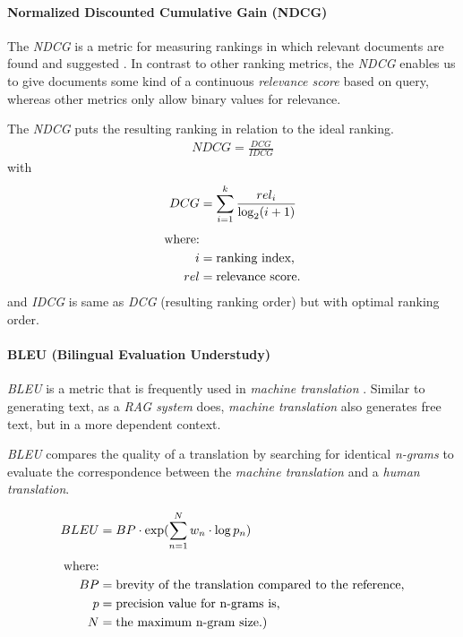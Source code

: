 \documentclass{article}
\begin{document}
\paragraph{Normalized Discounted Cumulative Gain (NDCG)}
The \textit{NDCG} is a metric for measuring rankings in which relevant documents are found and suggested \cite{NDCG}. In contrast to other ranking metrics, the \textit{NDCG} enables us to give documents some kind of a continuous \textit{relevance score} based on query, whereas other metrics only allow binary values for relevance.

The \textit{NDCG} puts the resulting ranking in relation to the ideal ranking.
\begin{align}
	 NDCG=\frac{DCG}{IDCG}
\end{align}
with
\begin{align*}
\begin{split}
	DCG&=\sum_{i=1}^{k}\frac{rel_{i}}{\log_{2}(i+1)}\\[0.25\baselineskip]
	\text{where:}\\
	i &= \text{ranking index,}\\ 
	rel &= \text{relevance score.}
\end{split}
\end{align*}
and \textit{IDCG} is same as \textit{DCG} (resulting ranking order) but with optimal ranking order.

\paragraph{BLEU (Bilingual Evaluation Understudy)} \textit{BLEU} is a metric that is frequently used in \textit{machine translation} \cite{BLEU}. Similar to generating text, as a \textit{RAG system} does, \textit{machine translation} also generates free text, but in a more dependent context.

\textit{BLEU} compares the quality of a translation by searching for identical \textit{n-grams} to evaluate the correspondence between the \textit{machine translation} and a \textit{human translation}.

\begin{align}
\begin{split}
	BLEU &= BP \cdot \exp(\sum_{n=1}^{N}{w_n\cdot\log p_{n}})\\[0.25\baselineskip]
	\text{where:}\\ 
    BP &= \text{brevity of the translation compared to the reference,}\\
	p &= \text{precision value for n-grams is,}\\ 
	N &= \text{the maximum n-gram size.)}
\end{split}
\end{align}
\end{document}
